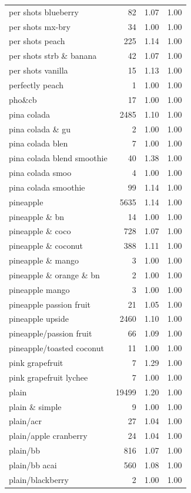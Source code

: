 \begin{table}
\begin{tabular}{lrrr}
per shots blueberry & 82 & 1.07 & 1.00 \\
per shots mx-bry & 34 & 1.00 & 1.00 \\
per shots peach & 225 & 1.14 & 1.00 \\
per shots strb \& banana & 42 & 1.07 & 1.00 \\
per shots vanilla & 15 & 1.13 & 1.00 \\
perfectly peach & 1 & 1.00 & 1.00 \\
pho\&cb & 17 & 1.00 & 1.00 \\
pina colada & 2485 & 1.10 & 1.00 \\
pina colada \& gu & 2 & 1.00 & 1.00 \\
pina colada blen & 7 & 1.00 & 1.00 \\
pina colada blend smoothie & 40 & 1.38 & 1.00 \\
pina colada smoo & 4 & 1.00 & 1.00 \\
pina colada smoothie & 99 & 1.14 & 1.00 \\
pineapple & 5635 & 1.14 & 1.00 \\
pineapple \& bn & 14 & 1.00 & 1.00 \\
pineapple \& coco & 728 & 1.07 & 1.00 \\
pineapple \& coconut & 388 & 1.11 & 1.00 \\
pineapple \& mango & 3 & 1.00 & 1.00 \\
pineapple \& orange \& bn & 2 & 1.00 & 1.00 \\
pineapple mango & 3 & 1.00 & 1.00 \\
pineapple passion fruit & 21 & 1.05 & 1.00 \\
pineapple upside & 2460 & 1.10 & 1.00 \\
pineapple/passion fruit & 66 & 1.09 & 1.00 \\
pineapple/toasted coconut & 11 & 1.00 & 1.00 \\
pink grapefruit & 7 & 1.29 & 1.00 \\
pink grapefruit lychee & 7 & 1.00 & 1.00 \\
plain & 19499 & 1.20 & 1.00 \\
plain \& simple & 9 & 1.00 & 1.00 \\
plain/acr & 27 & 1.04 & 1.00 \\
plain/apple cranberry & 24 & 1.04 & 1.00 \\
plain/bb & 816 & 1.07 & 1.00 \\
plain/bb acai & 560 & 1.08 & 1.00 \\
plain/blackberry & 2 & 1.00 & 1.00 \\

\end{tabular}
\end{table}
